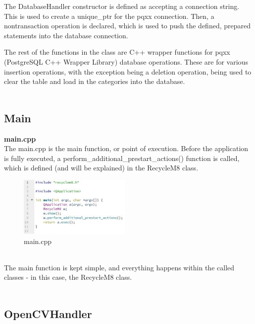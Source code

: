 \documentclass[conference]{IEEEtran}
\begin{document}
The DatabaseHandler constructor is defined as accepting a connection string. This is used to create a unique\_ptr for the pqxx connection. Then, a nontransaction operation is declared, which is used to push the defined, prepared statements into the database connection. 

The rest of the functions in the class are C++ wrapper functions for pqxx (PostgreSQL C++ Wrapper Library) database operations. These are for various insertion operations, with the exception being a deletion operation, being used to clear the table and load in the categories into the database.~\\~\\

\subsection{Main}

\textbf{main.cpp}~\\

The main.cpp is the main function, or point of execution. Before the application is fully executed, a perform\_additional\_prestart\_actions() function is called, which is defined (and will be explained) in the RecycleM8 class.

\begin{figure}[h]
    \centering
    \includegraphics[width=0.48\textwidth]{images/sourcecode/main_cpp.eps}
    \caption{main.cpp}
\end{figure}~\\

The main function is kept simple, and everything happens within the called classes - in this case, the RecycleM8 class.~\\~\\

\subsection{OpenCVHandler}
\end{document}
